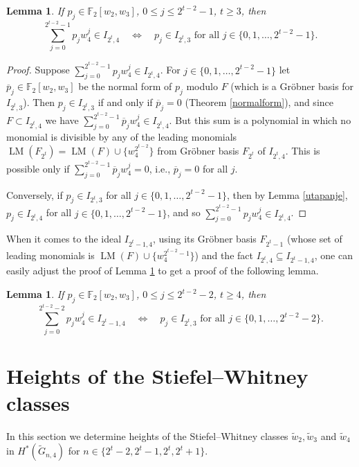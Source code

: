 \documentclass{amsart}
\newtheorem{lemma}[theorem]{Lemma}
\theoremstyle{definition}
\theoremstyle{remark}
\numberwithin{equation}{section}
\newcommand{\gr}{\widetilde G}
\newcommand{\w}{\widetilde w}
\newcommand{\lm}{\operatorname{LM}}
\renewcommand{\le}{\leqslant}
\renewcommand{\ge}{\geqslant}
\begin{document}
\begin{lemma}\label{lem: Vuk}
    If $p_j\in\mathbb F_2[w_2,w_3]$, $0\le j\le2^{t-2}-1$, $t\ge 3$,  then
    \[\sum_{j=0}^{2^{t-2}-1}p_jw_4^j\in I_{2^t,4} \quad \Longleftrightarrow \quad p_j\in I_{2^t,3} \mbox{ for all } j\in\{0,1,\ldots,2^{t-2}-1\}.\]
\end{lemma}
\begin{proof} 
Suppose $\sum_{j=0}^{2^{t-2}-1}p_jw_4^j\in I_{2^t,4}$. For $j\in\{0,1,\ldots,2^{t-2}-1\}$ let $\overline p_j\in\mathbb F_2[w_2,w_3]$ be the normal form of $p_j$ modulo $F$ (which is a Gr\"obner basis for $I_{2^t,3}$). Then $p_j\in I_{2^t,3}$ if and only if $\overline p_j=0$ (Theorem \ref{normalform}), and since $F\subset I_{2^t,4}$ we have $\sum_{j=0}^{2^{t-2}-1}\overline p_jw_4^j\in I_{2^t,4}$. But this sum is a polynomial in which no monomial is divisible by any of the leading monomials $\lm(F_{2^t})=\lm(F)\cup\{w_4^{2^{t-2}}\}$ from Gr\"obner basis $F_{2^t}$ of $I_{2^t,4}$. This is possible only if $\sum_{j=0}^{2^{t-2}-1}\overline p_jw_4^j=0$, i.e., $\overline p_j=0$ for all $j$.

Conversely, if $p_j\in I_{2^t,3}$ for all $j\in\{0,1,\ldots,2^{t-2}-1\}$, then by Lemma \ref{utapanje}, $p_j\in I_{2^t,4}$ for all $j\in\{0,1,\ldots,2^{t-2}-1\}$, and so $\sum_{j=0}^{2^{t-2}-1}p_jw_4^j\in I_{2^t,4}$.
\end{proof}
When it comes to the ideal $I_{2^t-1,4}$, using its Gr\"obner basis $F_{2^t-1}$ (whose set of leading monomials is $\lm(F)\cup\{w_4^{2^{t-2}-1}\}$) and the fact $I_{2^t,4}\subseteq I_{2^t-1,4}$, one can easily adjust the proof of Lemma \ref{lem: Vuk} to get a proof of the following lemma.
\begin{lemma}\label{lem: Vuk2}
    If $p_j\in\mathbb F_2[w_2,w_3]$, $0\le j\le2^{t-2}-2$, $t\ge4$, then
    \[\sum_{j=0}^{2^{t-2}-2}p_jw_4^j\in I_{2^{t}-1,4} \quad \Longleftrightarrow \quad p_j\in I_{2^t,3} \mbox{ for all } j\in\{0,1,\ldots,2^{t-2}-2\}.\]
\end{lemma}





\section{Heights of the Stiefel--Whitney classes}

In this section we determine heights of the Stiefel--Whitney classes $\w_2, \w_3$ and $\w_4$ in $H^*(\gr_{n,4})$ for $n\in\{2^t-2,2^t-1,2^t,2^t+1\}$.
\end{document}
